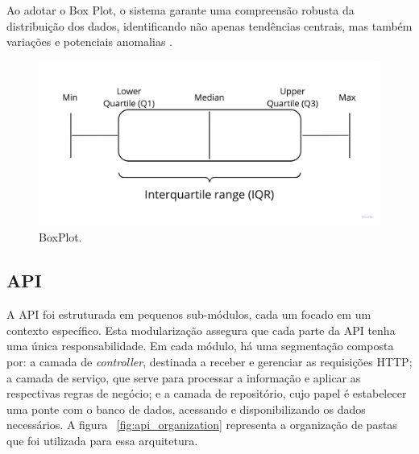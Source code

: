 Ao adotar o Box Plot, o sistema garante uma compreensão robusta da distribuição dos dados, identificando não apenas tendências centrais, mas também variações e potenciais anomalias \cite{marmolejo2010shifting}.

\begin{figure}[htbp]
	\centering
	\includegraphics[width=\textwidth]{images/boxplot.jpg}
	\caption{BoxPlot.}
	\label{fig:boxplot}
\end{figure}


\subsection{API}\label{subsec:apiArchitecture}
A \gls{API} foi estruturada em pequenos sub-módulos, cada um focado em um contexto específico. Esta modularização assegura que cada parte da \gls{API} tenha uma única responsabilidade. Em cada módulo, há uma segmentação composta por: a camada de \textit{controller}, destinada a receber e gerenciar as requisições \gls{HTTP}; a camada de serviço, que serve para processar a informação e aplicar as respectivas regras de negócio; e a camada de repositório, cujo papel é estabelecer uma ponte com o banco de dados, acessando e disponibilizando os dados necessários. A figura ~\ref{fig:api_organization} representa a organização de pastas que foi utilizada para essa arquitetura.

